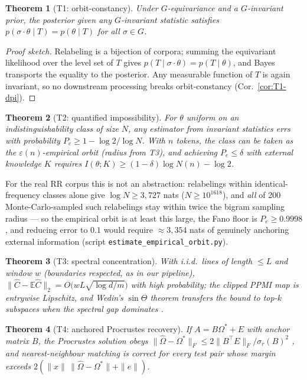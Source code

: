 \documentclass[10pt,twocolumn]{article}
\newtheorem{theorem}{Theorem}[section]
\newenvironment{proofsketch}{\begin{proof}[Proof sketch]}{\end{proof}}
\begin{document}
\begin{theorem}[T1: orbit-constancy]
\label{thm:T1-body}
Under $G$-equivariance and a $G$-invariant prior, the posterior given
any $G$-invariant statistic satisfies
$p(\sigma\cdot\theta\mid T)=p(\theta\mid T)$ for all $\sigma\in G$.
\end{theorem}
\begin{proofsketch}
Relabeling is a bijection of corpora; summing the equivariant
likelihood over the level set of $T$ gives
$p(T\mid\sigma\cdot\theta)=p(T\mid\theta)$, and Bayes transports the
equality to the posterior. Any measurable function of $T$ is again
invariant, so no downstream processing breaks orbit-constancy
(Cor.~\ref{cor:T1-dpi}).
\end{proofsketch}

\begin{theorem}[T2: quantified impossibility]
\label{thm:T2-body}
For $\theta$ uniform on an indistinguishability class of size $N$, any
estimator from invariant statistics errs with probability
$P_e\ge1-\log2/\log N$. With $n$ tokens, the class can be taken as the
$\varepsilon(n)$-empirical orbit (radius from T3), and achieving
$P_e\le\delta$ with external knowledge $K$ requires
$I(\theta;K)\ge(1-\delta)\log N(n)-\log2$.
\end{theorem}

For the real RR corpus this is not an abstraction: relabelings within
identical-frequency classes alone give $\log N\ge3{,}727$ nats
($N\ge10^{1618}$), and \emph{all} of 200 Monte-Carlo-sampled such
relabelings stay within twice the bigram sampling radius --- so the
empirical orbit is at least this large, the Fano floor is
$P_e\ge0.9998$, and reducing error to $0.1$ would require
$\approx3{,}354$ nats of genuinely anchoring external information
(script \texttt{estimate\_empirical\_orbit.py}).

\begin{theorem}[T3: spectral concentration]
\label{thm:T3-body}
With i.i.d.\ lines of length $\le L$ and window $w$ (boundaries
respected, as in our pipeline),
$\|\hat C-\mathbb{E}\hat C\|_2=O\!\big(wL\sqrt{\log d/m}\big)$ with
high probability; the clipped PPMI map is entrywise Lipschitz, and
Wedin's $\sin\Theta$ theorem \cite{wedin1972,daviskahan1970} transfers
the bound to top-$k$ subspaces when the spectral gap dominates
\cite{tropp2015}.
\end{theorem}

\begin{theorem}[T4: anchored Procrustes recovery]
\label{thm:T4-body}
If $A=B\Omega^*+E$ with anchor matrix $B$, the Procrustes solution
obeys $\|\hat\Omega-\Omega^*\|_F\le2\|B^\top E\|_F/\sigma_r(B)^2$
\cite{li1995}, and nearest-neighbour matching is correct for every
test pair whose margin exceeds
$2(\|x\|\,\|\hat\Omega-\Omega^*\|+\|e\|)$.
\end{theorem}
\end{document}
